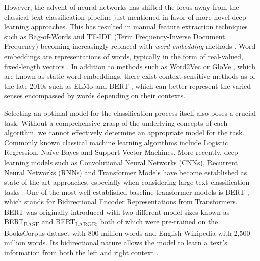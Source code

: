 \documentclass[english,bachelor,ul]{webisthesis} %
\begin{document}

However, the advent of neural networks has shifted the focus away from the classical text classification pipeline just mentioned in favor of more novel deep learning approaches. This has resulted in manual feature extraction techniques such as Bag-of-Words and TF-IDF (Term Frequency-Inverse Document Frequency) becoming increasingly replaced with \textit{word embedding} methods \citep{DBLP:journals/csur/MinaeeKCNCG21}. Word embeddings are representations of words, typically in the form of real-valued, fixed-length vectors \citep{DBLP:journals/corr/abs-1901-09069}. In addition to methods such as Word2Vec \citep{DBLP:journals/corr/abs-1301-3781, DBLP:conf/nips/MikolovSCCD13} or GloVe \citep{DBLP:conf/emnlp/PenningtonSM14}, which are known as static word embeddings, there exist context-sensitive methods as of the late-2010s such as ELMo \citep{DBLP:conf/naacl/PetersNIGCLZ18} and BERT \citep{DBLP:conf/naacl/DevlinCLT19}, which can better represent the varied senses encompassed by words depending on their contexts.

Selecting an optimal model for the classification process itself also poses a crucial task. Without a comprehensive grasp of the underlying concepts of each algorithm, we cannot effectively determine an appropriate model for the task. Commonly known classical machine learning algorithms include Logistic Regression, Na\"ive Bayes and Support Vector Machines. More recently, deep learning models such as Convolutional Neural Networks (CNNs), Recurrent Neural Networks (RNNs) and Transformer Models have become established as state-of-the-art approaches, especially when considering large text classification tasks \citep{chen2015convolutional, DBLP:conf/ijcai/LiuQH16, DBLP:conf/aaai/LaiXLZ15, DBLP:conf/naacl/DevlinCLT19, DBLP:conf/cncl/SunQXH19}. One of the most well-established baseline transformer models is BERT \citep{DBLP:conf/naacl/DevlinCLT19}, which stands for Bidirectional Encoder Representations from Transformers. BERT was originally introduced with two different model sizes known as BERT\textsubscript{BASE} and BERT\textsubscript{LARGE}, both of which were pre-trained on the BooksCorpus dataset \citep{DBLP:conf/iccv/ZhuKZSUTF15} with 800 million words and English Wikipedia with 2,500 million words. Its bidirectional nature allows the model to learn a text's information from both the left and right context \citep{DBLP:conf/naacl/DevlinCLT19}. 
\end{document}
